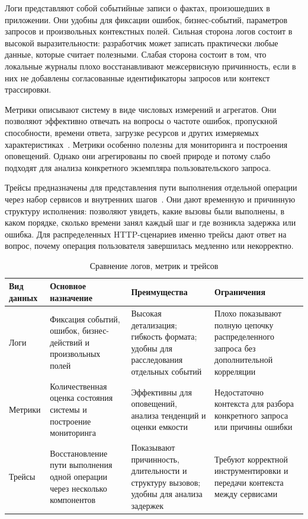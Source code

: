 Логи представляют собой событийные записи о фактах, произошедших в приложении.
Они удобны для фиксации ошибок, бизнес-событий, параметров запросов и произвольных
контекстных полей. Сильная сторона логов состоит в высокой выразительности:
разработчик может записать практически любые данные, которые считает полезными.
Слабая сторона состоит в том, что локальные журналы плохо восстанавливают
межсервисную причинность, если в них не добавлены согласованные идентификаторы
запросов или контекст трассировки.

Метрики описывают систему в виде числовых измерений и агрегатов. Они позволяют
эффективно отвечать на вопросы о частоте ошибок, пропускной способности, времени
ответа, загрузке ресурсов и других измеряемых характеристиках~\cite{otelSignals}.
Метрики особенно полезны для мониторинга и построения оповещений. Однако они
агрегированы по своей природе и потому слабо подходят для анализа конкретного
экземпляра пользовательского запроса.

Трейсы предназначены для представления пути выполнения отдельной операции через
набор сервисов и внутренних шагов~\cite{otelWhatIs,jaegerArchitecture}. Они дают
временную и причинную структуру исполнения: позволяют увидеть, какие вызовы были
выполнены, в каком порядке, сколько времени занял каждый шаг и где возникла
задержка или ошибка. Для распределенных HTTP-сценариев именно трейсы дают ответ на
вопрос, почему операция пользователя завершилась медленно или некорректно.

\begin{table}[H]
    \centering
    \caption{Сравнение логов, метрик и трейсов}
    \label{tab:signals-comparison}
    \renewcommand{\arraystretch}{1.2}
    \begin{tabularx}{\textwidth}{>{\raggedright\arraybackslash}p{2.4cm} >{\raggedright\arraybackslash}X >{\raggedright\arraybackslash}X >{\raggedright\arraybackslash}X}
        \toprule
        Вид данных & Основное назначение & Преимущества & Ограничения \\
        \midrule
        Логи & Фиксация событий, ошибок, бизнес-действий и произвольных полей & Высокая детализация; гибкость формата; удобны для расследования отдельных событий & Плохо показывают полную цепочку распределенного запроса без дополнительной корреляции \\
        \addlinespace
        Метрики & Количественная оценка состояния системы и построение мониторинга & Эффективны для оповещений, анализа тенденций и оценки емкости & Недостаточно контекста для разбора конкретного запроса или причины ошибки \\
        \addlinespace
        Трейсы & Восстановление пути выполнения одной операции через несколько компонентов & Показывают причинность, длительности и структуру вызовов; удобны для анализа задержек & Требуют корректной инструментировки и передачи контекста между сервисами \\
        \bottomrule
    \end{tabularx}
\end{table}

